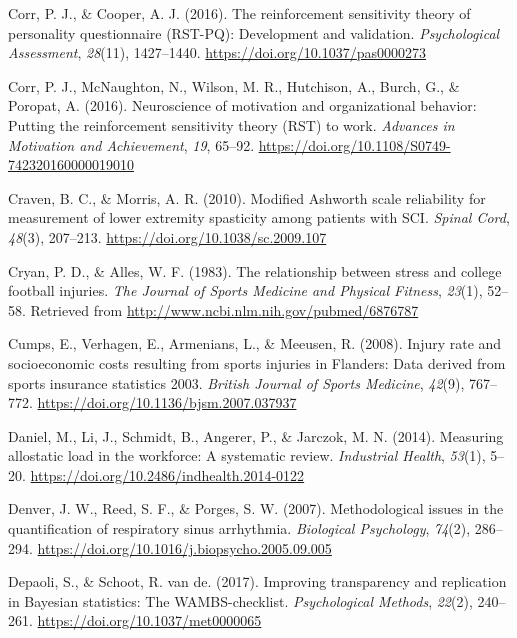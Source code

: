 \documentclass[
  english,
  man,floatsintext]{apa6}
\begin{document}
\leavevmode\hypertarget{ref-Corr2016c}{}%
Corr, P. J., \& Cooper, A. J. (2016). The reinforcement sensitivity theory of personality questionnaire (RST-PQ): Development and validation. \emph{Psychological Assessment}, \emph{28}(11), 1427--1440. \url{https://doi.org/10.1037/pas0000273}

\leavevmode\hypertarget{ref-Corr2016b}{}%
Corr, P. J., McNaughton, N., Wilson, M. R., Hutchison, A., Burch, G., \& Poropat, A. (2016). Neuroscience of motivation and organizational behavior: Putting the reinforcement sensitivity theory (RST) to work. \emph{Advances in Motivation and Achievement}, \emph{19}, 65--92. \url{https://doi.org/10.1108/S0749-742320160000019010}

\leavevmode\hypertarget{ref-Craven2010}{}%
Craven, B. C., \& Morris, A. R. (2010). Modified Ashworth scale reliability for measurement of lower extremity spasticity among patients with SCI. \emph{Spinal Cord}, \emph{48}(3), 207--213. \url{https://doi.org/10.1038/sc.2009.107}

\leavevmode\hypertarget{ref-Cryan1983}{}%
Cryan, P. D., \& Alles, W. F. (1983). The relationship between stress and college football injuries. \emph{The Journal of Sports Medicine and Physical Fitness}, \emph{23}(1), 52--58. Retrieved from \url{http://www.ncbi.nlm.nih.gov/pubmed/6876787}

\leavevmode\hypertarget{ref-Cumps2008a}{}%
Cumps, E., Verhagen, E., Armenians, L., \& Meeusen, R. (2008). Injury rate and socioeconomic costs resulting from sports injuries in Flanders: Data derived from sports insurance statistics 2003. \emph{British Journal of Sports Medicine}, \emph{42}(9), 767--772. \url{https://doi.org/10.1136/bjsm.2007.037937}

\leavevmode\hypertarget{ref-Mauss2014}{}%
Daniel, M., Li, J., Schmidt, B., Angerer, P., \& Jarczok, M. N. (2014). Measuring allostatic load in the workforce: A systematic review. \emph{Industrial Health}, \emph{53}(1), 5--20. \url{https://doi.org/10.2486/indhealth.2014-0122}

\leavevmode\hypertarget{ref-Denver2007}{}%
Denver, J. W., Reed, S. F., \& Porges, S. W. (2007). Methodological issues in the quantification of respiratory sinus arrhythmia. \emph{Biological Psychology}, \emph{74}(2), 286--294. \url{https://doi.org/10.1016/j.biopsycho.2005.09.005}

\leavevmode\hypertarget{ref-Depaoli2017}{}%
Depaoli, S., \& Schoot, R. van de. (2017). Improving transparency and replication in Bayesian statistics: The WAMBS-checklist. \emph{Psychological Methods}, \emph{22}(2), 240--261. \url{https://doi.org/10.1037/met0000065}
\end{document}
